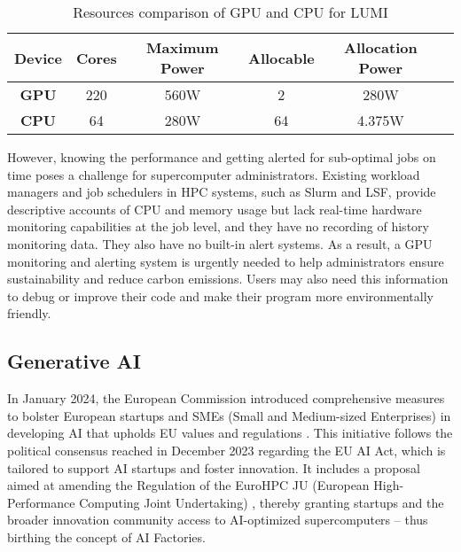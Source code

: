 \begin{table}[H]
    \centering
    \begin{tabular}{|c|c|c|c|c|c|}
        \hline
        \textbf{Device} & \textbf{Cores} & \textbf{Maximum Power} & \textbf{Allocable} & \textbf{Allocation Power} \\
        \hline
        \textbf{GPU} & 220 & 560W & 2 & 280W \\
        \hline
        \textbf{CPU} & 64 & 280W & 64 & 4.375W \\
        \hline
    \end{tabular}
    \caption{Resources comparison of GPU and CPU for LUMI}
    \label{tab:lumi_resources}
\end{table}

However, knowing the performance and getting alerted for sub-optimal jobs on time poses a challenge for supercomputer administrators. Existing workload managers and job schedulers in HPC systems, such as Slurm and LSF, provide descriptive accounts of CPU and memory usage but lack real-time hardware monitoring capabilities at the job level, and they have no recording of history monitoring data. They also have no built-in alert systems. As a result, a GPU monitoring and alerting system is urgently needed to help administrators ensure sustainability and reduce carbon emissions. Users may also need this information to debug or improve their code and make their program more environmentally friendly.


\subsection{Generative AI}
In January 2024, the European Commission introduced comprehensive measures to bolster European startups and SMEs (Small and Medium-sized Enterprises) in developing AI that upholds EU values and regulations \cite{eu-ai}. This initiative follows the political consensus reached in December 2023 regarding the EU AI Act, which is tailored to support AI startups and foster innovation. It includes a proposal aimed at amending the Regulation of the EuroHPC JU (European High-Performance Computing Joint Undertaking) \cite{european_union_2021}, thereby granting startups and the broader innovation community access to AI-optimized supercomputers -- thus birthing the concept of AI Factories.

